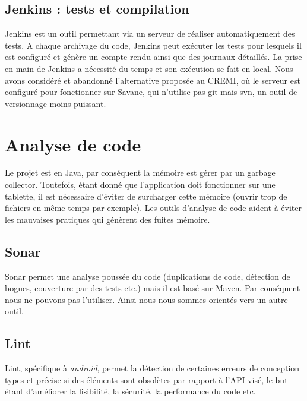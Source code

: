 \subsection{Jenkins : tests et compilation}
Jenkins est un outil permettant via un serveur de réaliser automatiquement des tests. A chaque archivage du code, Jenkins peut exécuter les tests pour lesquels il est configuré et génère
un compte-rendu ainsi que des journaux détaillés. La prise en main de Jenkins a nécessité du temps et son exécution
se fait en local. Nous avons considéré et abandonné l'alternative proposée au CREMI, où le serveur est configuré pour fonctionner sur Savane, qui n'utilise pas git mais svn, un outil de versionnage moins puissant.

\section{Analyse de code}

Le projet est en Java, par conséquent la mémoire est gérer par un garbage collector. Toutefois, étant donné que l'application doit 
fonctionner sur une tablette, il est nécessaire d'éviter de surcharger cette mémoire (ouvrir trop de fichiers en même temps par exemple). Les outils d'analyse de code aident à éviter les mauvaises pratiques qui génèrent des fuites mémoire.
\subsection{Sonar}
Sonar permet une analyse poussée du code (duplications de code, détection de bogues, couverture par des tests etc.) mais il est basé sur Maven. Par conséquent nous ne pouvons pas l'utiliser. Ainsi nous nous sommes orientés vers un autre outil.

\subsection{Lint}
Lint, spécifique à \emph{android}, permet la détection de certaines erreurs de conception types et précise si des éléments sont
obsolètes par rapport à l'API visé, le but étant d'améliorer la lisibilité, la sécurité, la performance du code etc.
